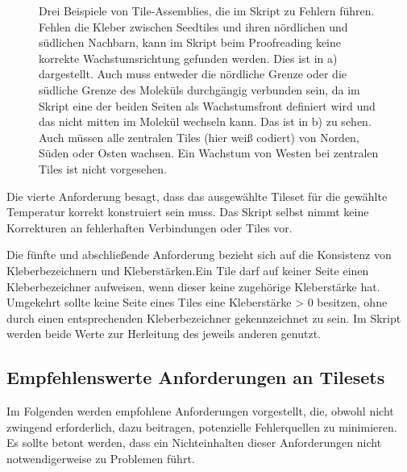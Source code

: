 \begin{figure}
\begin{tikzpicture}[scale=0.85]
    \end{tikzpicture}
    \caption[Negativbeispiele für die Konstruktion durch das Skript]{Drei Beispiele von Tile-Assemblies, die im Skript zu Fehlern führen. Fehlen die Kleber zwischen Seedtiles und ihren nördlichen und südlichen Nachbarn, kann im Skript beim Proofreading keine korrekte Wachstumsrichtung gefunden werden. Dies ist in a) dargestellt. Auch muss entweder die nördliche Grenze oder die südliche Grenze des Moleküls durchgängig verbunden sein, da im Skript eine der beiden Seiten als Wachstumsfront definiert wird und das nicht mitten im Molekül wechseln kann. Das ist in b) zu sehen. Auch müssen alle zentralen Tiles (hier weiß codiert) von Norden, Süden oder Osten wachsen. Ein Wachstum von Westen bei zentralen Tiles ist nicht vorgesehen.}
    \label{fig:negativbsp_konstruktion}
\end{figure}

Die vierte Anforderung besagt, dass das ausgewählte Tileset für die gewählte Temperatur korrekt konstruiert sein muss. Das Skript selbst nimmt keine Korrekturen an fehlerhaften Verbindungen oder Tiles vor.

Die fünfte und abschließende Anforderung bezieht sich auf die Konsistenz von Kleberbezeichnern und Kleberstärken.Ein Tile darf auf keiner Seite einen Kleberbezeichner aufweisen, wenn dieser keine zugehörige Kleberstärke hat. Umgekehrt sollte keine Seite eines Tiles eine Kleberstärke > 0 besitzen, ohne durch einen entsprechenden Kleberbezeichner gekennzeichnet zu sein. Im Skript werden beide Werte zur Herleitung des jeweils anderen genutzt.

\subsection{Empfehlenswerte Anforderungen an Tilesets}

Im Folgenden werden empfohlene Anforderungen vorgestellt, die, obwohl nicht zwingend erforderlich, dazu beitragen, potenzielle Fehlerquellen zu minimieren. Es sollte betont werden, dass ein Nichteinhalten dieser Anforderungen nicht notwendigerweise zu Problemen führt. 

